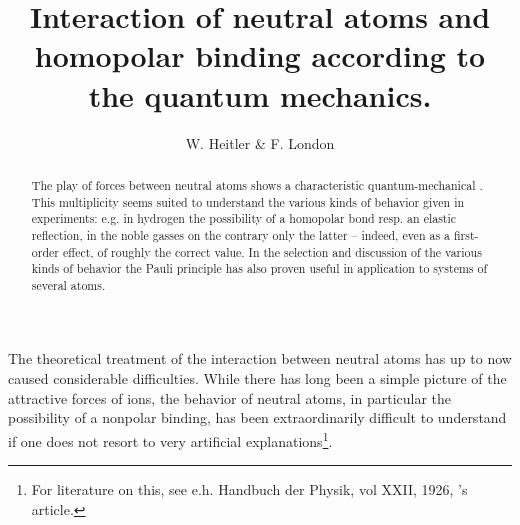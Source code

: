 \begin{paper}{1}
\begin{header}
\title{Interaction of neutral atoms and homopolar binding according to the quantum mechanics.}
\author{W. Heitler \& F. London}
\makeheader
\end{header}
\newcommand{\angstrom}{\mbox{\normalfont\AA}}
\renewcommand{\H}{\El{H}}
\newcommand{\He}{\El{He}}


\begin{abstract}
The play of forces between neutral atoms shows a characteristic quantum-mechanical . This multiplicity seems suited to understand the various kinds of behavior given in experiments: e.g. in hydrogen the possibility of a homopolar bond resp. an elastic reflection, in the noble gasses on the contrary only the latter -- indeed, even as a first-order effect, of roughly the correct value. In the selection and discussion of the various kinds of behavior the Pauli principle has also proven useful in application to systems of several atoms.
\end{abstract}

The theoretical treatment of the interaction between neutral atoms has up to now caused considerable difficulties. While there has long been a simple picture of the attractive forces of ions, the behavior of neutral atoms, in particular the possibility of a nonpolar binding, has been extraordinarily difficult to understand if one does not resort to very artificial explanations\footnote{For literature on this, see e.h. Handbuch der Physik, vol XXII, 1926, \citeauthor{Herzfeld}'s article.}. 


\end{paper}
